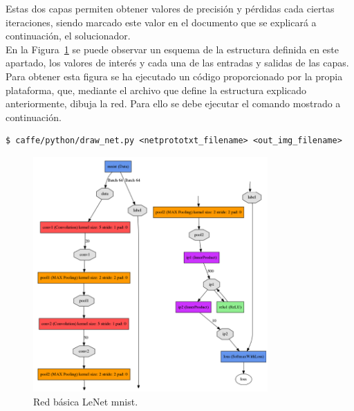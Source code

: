 	Estas dos capas permiten obtener valores de precisión y pérdidas cada ciertas iteraciones, siendo marcado este valor en el documento que se explicará a continuación, el solucionador.\\

	En la Figura~\ref{fig.redBasica} se puede observar un esquema de la estructura definida en este apartado, los valores de interés y cada una de las entradas y salidas de las capas. Para obtener esta figura se ha ejecutado un código proporcionado por la propia plataforma, que, mediante el archivo que define la estructura explicado anteriormente, dibuja la red. Para ello se debe ejecutar el comando mostrado a continuación.
	\vspace{10pt}
	\begin{lstlisting}[frame=single]
	$ caffe/python/draw_net.py <netprototxt_filename> <out_img_filename>
	\end{lstlisting}
	
	\begin{figure}[H]
		\begin{center}
			\includegraphics[width=0.8\textwidth]{figures/Original_net}
			\caption{Red básica LeNet \acrshort{mnist}.}
			\label{fig.redBasica}
		\end{center}
	\end{figure}
	
